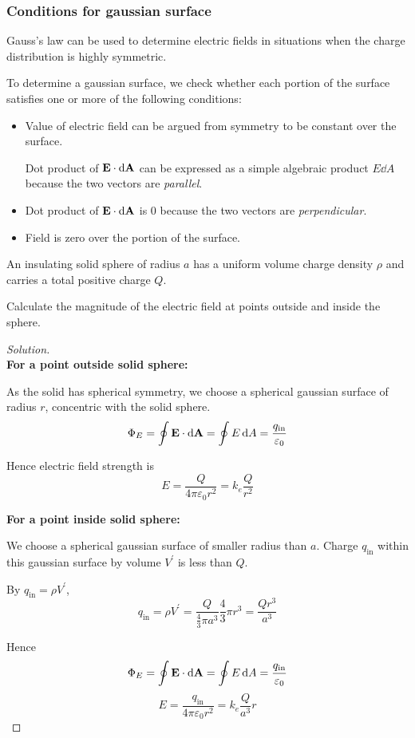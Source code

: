 \subsubsection{Conditions for gaussian surface}
Gauss's law can be used to determine electric fields in situations when the charge distribution is highly symmetric.

To determine a gaussian surface, we check whether each portion of the surface satisfies one or more of the following conditions:
\begin{itemize}
\item Value of electric field can be argued from symmetry to be constant over the surface.

Dot product of $\vb{E}\cdot\dd{\vb{A}}$ can be expressed as a simple algebraic product $E\dd{A}$ because the two vectors are \emph{parallel}.

\item Dot product of $\vb{E}\cdot\dd{\vb{A}}$ is 0 because the two vectors are \emph{perpendicular}.

\item Field is zero over the portion of the surface.
\end{itemize}
\pagebreak

\begin{exmp}
An insulating solid sphere of radius $a$ has a uniform volume charge density $\rho$ and carries a total positive charge $Q$.

Calculate the magnitude of the electric field at points outside and inside the sphere.
\end{exmp}
\begin{proof}[Solution] \ {\\}
\textbf{For a point outside solid sphere:}

As the solid has spherical symmetry, we choose a spherical gaussian surface of radius $r$, concentric with the solid sphere.
\[ \Phi_E = \oint\vb{E}\cdot\dd{\vb{A}} = \oint E\dd{A} = \frac{q_\text{in}}{\varepsilon_0} \]

Hence electric field strength is 
\[ E = \frac{Q}{4\pi\varepsilon_0r^2} = k_e\frac{Q}{r^2} \]

\textbf{For a point inside solid sphere:}

We choose a spherical gaussian surface of smaller radius than $a$. Charge $q_\text{in}$ within this gaussian surface by volume $V^\prime$ is less than $Q$.

By $q_\text{in}=\rho V^\prime$,
\[ q_\text{in} = \rho V^\prime = \frac{Q}{\frac{4}{3}\pi a^3}\frac{4}{3}\pi r^3 = \frac{Qr^3}{a^3} \]

Hence 
\[ \Phi_E = \oint\vb{E}\cdot\dd{\vb{A}} = \oint E\dd{A} = \frac{q_\text{in}}{\varepsilon_0} \]
\[ E = \frac{q_\text{in}}{4\pi\varepsilon_0r^2} = k_e\frac{Q}{a^3}r \]
\end{proof}
\pagebreak

